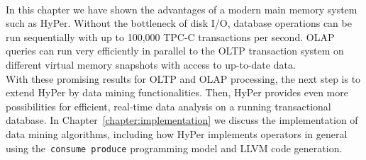 \\
In this chapter we have shown the advantages of a modern main memory system such as HyPer. Without the bottleneck of disk I/O, database operations can be run sequentially with up to 100,000 TPC-C transactions per second. OLAP queries can run very efficiently in parallel to the OLTP transaction system on different virtual memory snapshots with access to up-to-date data. 
\\
With these promising results for OLTP and OLAP processing, the next step is to extend HyPer by data mining functionalities. Then, HyPer provides even more possibilities for efficient, real-time data analysis on a running transactional database. In Chapter~\ref{chapter:implementation} we discuss the implementation of data mining algorithms, including how HyPer implements operators in general using the~\texttt{consume produce} programming model and LLVM code generation. 



